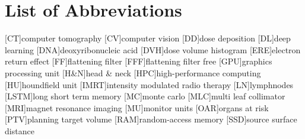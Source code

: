 \documentclass[12pt, oneside]{article}
\begin{document}
\newpage

%
\listoftables


\newpage

\section*{List of Abbreviations}
%
\begin{acronym}[ACRO]\itemsep4pt
  [CT]{computer tomography}
  [CV]{computer vision}
  [DD]{dose deposition}
  [DL]{deep learning}
  [DNA]{deoxyribonucleic acid}
  [DVH]{dose volume histogram}
  [ERE]{electron return effect}
  [FF]{flattening filter}
  [FFF]{flattening filter free}
  [GPU]{graphics processing unit}
  [H\&N]{head \& neck}
  [HPC]{high-performance computing}
  [HU]{houndfield unit}
  [IMRT]{intensity modulated radio therapy}
  [LN]{lymphnodes}
  [LSTM]{long short term memory}
  [MC]{monte carlo}
  [MLC]{multi leaf collimator}
  [MRI]{magnet resonance imaging}
  [MU]{monitor units}
  [OAR]{organs at risk}
  [PTV]{planning target volume}
  [RAM]{random-access memory}
  [SSD]{source surface distance}
\end{acronym}


\newpage
{}
\setcounter{page}{1}
  


\end{document}
